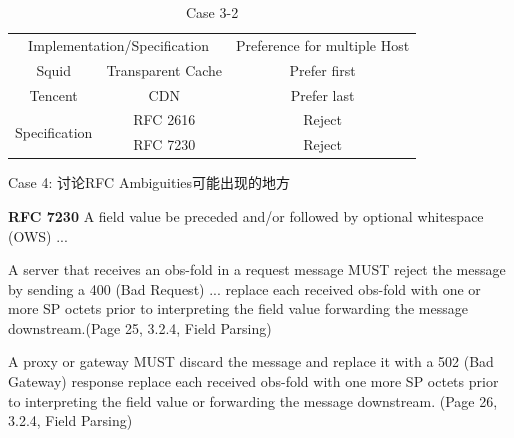 \begin{table}[!htbp]
	\renewcommand\arraystretch{1}
	\centering
	\begin{tabular}{|c|c|c|}
		\hline
		\multicolumn{2}{|c|}{\multirow{2}{*}{Implementation/Specification}} &
		\multirow{2}{*}{Preference for multiple Host}
		\\ 
		\multicolumn{2}{|c|}{} & 
		\\ \hline
		Squid & Transparent Cache & Prefer first 
		\\ \hline
		Tencent & CDN & Prefer last
		\\ \hline \hline
		\multirow{2}{*}{Specification} & RFC 2616 & Reject
		\\ \cline{2-3}
		& RFC 7230 & Reject
		\\ \hline
	\end{tabular}
\caption{Case 3-2}
\end{table}


Case 4: 讨论RFC Ambiguities可能出现的地方
\begin{spacing}{0.8}
	\begin{tcolorbox}
		\textbf{RFC 7230} A field value {\color{red}{might}} be preceded and/or followed by optional whitespace (OWS) ...
	\end{tcolorbox}
\end{spacing}

\vspace{1ex}

\begin{spacing}{0.8}
	\begin{tcolorbox}
		A server that receives an obs-fold in a request message MUST {\color{red}{either}} reject the message by
		sending a 400 (Bad Request) ... {\color{red}{or}} replace each received obs-fold with one or more SP octets prior to interpreting the field value {\color{red}{or}} forwarding the message downstream.(Page 25, 3.2.4, Field Parsing)
	\end{tcolorbox}
\end{spacing}

\vspace{1ex}

\begin{spacing}{0.8}
	\begin{tcolorbox}
	A proxy or gateway MUST {\color{red}{either}} discard the message and replace it with a 502 (Bad Gateway) response {\color{red}{or}} replace each received obs-fold with one {\color{red}{or}} more SP octets prior to interpreting the field value or forwarding the message downstream.  (Page 26, 3.2.4, Field Parsing)
	\end{tcolorbox}
\end{spacing}